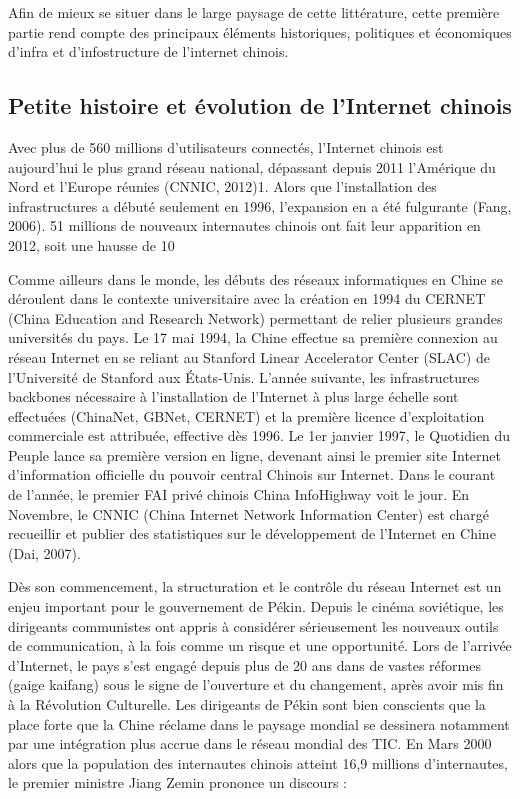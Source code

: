 Afin de mieux se situer dans le large paysage de cette littérature, cette première partie rend compte des principaux éléments historiques, politiques et économiques d’infra et d’infostructure de l’internet chinois.

\subsection[Petite histoire et évolution de l’Internet chinois]{Petite histoire et évolution de l’Internet chinois}

Avec plus de 560 millions d’utilisateurs connectés, l’Internet chinois est aujourd’hui le plus grand réseau national, dépassant depuis 2011 l’Amérique du Nord et l’Europe réunies (CNNIC, 2012)1. Alors que l’installation des infrastructures a débuté seulement en 1996, l’expansion en a été fulgurante (Fang, 2006). 51 millions de nouveaux internautes chinois ont fait leur apparition en 2012, soit une hausse de 10%

Comme ailleurs dans le monde, les débuts des réseaux informatiques en Chine se déroulent dans le contexte universitaire avec la création en 1994 du CERNET (China Education and Research Network) permettant de relier plusieurs grandes universités du pays. Le 17 mai 1994, la Chine effectue sa première connexion au réseau Internet en se reliant au Stanford Linear Accelerator Center (SLAC) de l’Université de Stanford aux États-Unis. L’année suivante, les infrastructures backbones nécessaire à l’installation de l’Internet à plus large échelle sont effectuées (ChinaNet, GBNet, CERNET) et la première licence d’exploitation commerciale est attribuée, effective dès 1996. Le 1er janvier 1997, le Quotidien du Peuple lance sa première version en ligne, devenant ainsi le premier site Internet d’information officielle du pouvoir central Chinois sur Internet. Dans le courant de l’année, le premier FAI privé chinois China InfoHighway voit le jour. En Novembre, le CNNIC (China Internet Network Information Center) est chargé recueillir et publier des statistiques sur le développement de l’Internet en Chine (Dai, 2007).

Dès son commencement, la structuration et le contrôle du réseau Internet est un enjeu important pour le gouvernement de Pékin. Depuis le cinéma soviétique, les dirigeants communistes ont appris à considérer sérieusement les nouveaux outils de communication, à la fois comme un risque et une opportunité. Lors de l’arrivée d’Internet, le pays s’est engagé depuis plus de 20 ans dans de vastes réformes (gaige kaifang) sous le signe de l’ouverture et du changement, après avoir mis fin à la Révolution Culturelle. Les dirigeants de Pékin sont bien conscients que la place forte que la Chine réclame dans le paysage mondial se dessinera notamment par une intégration plus accrue dans le réseau mondial des TIC. En Mars 2000 alors que la population des internautes chinois atteint 16,9 millions d’internautes, le premier ministre Jiang Zemin prononce un discours :

